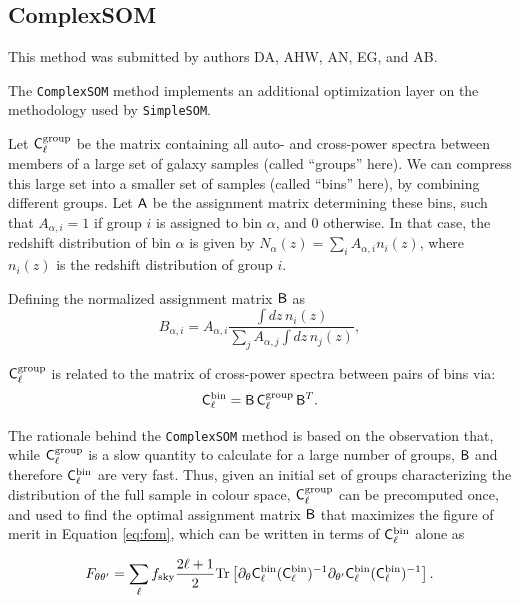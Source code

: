 \documentclass[twocolumn,twocolappendix]{aastex63}
\begin{document}
\subsection{ {\sc ComplexSOM} } \label{sec:csom}
This method was submitted by authors DA, AHW, AN, EG, and AB.

The {\tt ComplexSOM} method implements an additional optimization layer on the
methodology used by {\tt SimpleSOM}.

Let ${\sf C}^{\rm group}_\ell$ be the matrix containing all auto- and
cross-power spectra between members of a large set of galaxy samples (called
``groups'' here). We can compress this large set into a smaller set of samples
(called ``bins'' here), by combining different groups. Let ${\sf A}$ be the
assignment matrix determining these bins, such that $A_{\alpha,i}=1$ if group
$i$ is assigned to bin $\alpha$, and 0 otherwise. In that case, the redshift
distribution of bin $\alpha$ is given by $N_\alpha(z)=\sum_i
A_{\alpha,i}n_i(z)$, where $n_i(z)$ is the redshift distribution of group $i$.

Defining the normalized assignment matrix ${\sf B}$ as
\begin{equation}
B_{\alpha,i}=A_{\alpha,i}\frac{\int dz\,n_i(z)}{\sum_j A_{\alpha,j}\int dz\,n_j(z)},
\end{equation}

${\sf C}^{\rm group}_\ell$ is related to the matrix of cross-power spectra
between pairs of bins via:
\begin{equation}
{\sf C}^{\rm bin}_\ell={\sf B}\,{\sf C}^{\rm group}_\ell\,{\sf B}^T.
\end{equation}

The rationale behind the {\tt ComplexSOM} method is based on the observation
that, while ${\sf C}^{\rm group}_\ell$ is a slow quantity to calculate for a
large number of groups, ${\sf B}$ and therefore ${\sf C}^{\rm bin}_\ell$ are
very fast. Thus, given an initial set of groups characterizing the
distribution of the full sample in colour space, ${\sf C}^{\rm group}_\ell$
can be precomputed once, and used to find the optimal assignment matrix ${\sf
B}$ that maximizes the figure of merit in Equation \ref{eq:fom},
which can be written in terms of ${\sf C}^{\rm bin}_\ell$ alone as

\begin{equation}\label{eq:fom_tr}
F_{\theta\theta'}=\sum_\ell f_{\rm sky}\frac{2\ell+1}{2}{\rm Tr}\left[\partial_\theta{\sf C}^{\rm bin}_\ell({\sf C}^{\rm bin}_\ell)^{-1}\partial_{\theta'}{\sf C}^{\rm bin}_\ell({\sf C}_\ell^{\rm bin})^{-1}\right].
\end{equation}
\end{document}
